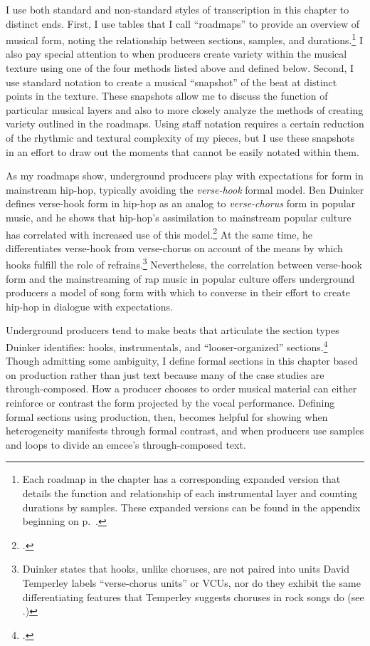 I use both standard and non-standard styles of transcription in this chapter to distinct
ends. First, I use tables that I call ``roadmaps'' to provide an overview of musical form,
noting the  relationship between sections, samples, and durations.\footnote{
    Each roadmap in the chapter has a corresponding expanded version that details the 
    function and relationship of each instrumental layer and counting durations by 
    samples. These expanded versions can be found in the appendix beginning on
    p.~\pageref{appendix:fullroadmaps}.} 
I also pay special attention to when producers create variety within the musical texture
using one of the four methods listed above and defined below. Second, I use standard
notation to create a musical ``snapshot'' of the beat at distinct points in the texture.
These snapshots allow me to discuss the function of particular musical layers and also to
more closely analyze the methods of creating variety outlined in the roadmaps. Using staff
notation requires a certain reduction of the rhythmic and textural complexity of my pieces,
but I use these snapshots in an effort to draw out the moments that cannot be easily notated
within them.

As my roadmaps show, underground producers play with expectations for form in mainstream
hip-hop, typically avoiding the \emph{verse-hook} formal model. Ben Duinker defines 
verse-hook form in hip-hop as an analog to \emph{verse-chorus} form in popular music, and
he shows that hip-hop's assimilation to mainstream popular culture has correlated with
increased use of this model.\footnote{
    \autocite[105]{benduinkerSongFormMainstreaming2020}.}\label{duinkerhookdef}
At the same time, he differentiates verse-hook from verse-chorus on account of the means
by which hooks fulfill the role of refrains.\footnote{
    Duinker states that hooks, unlike choruses, are not paired into units David Temperley
    labels ``verse-chorus units'' or VCUs, nor do they exhibit the same differentiating
    features that Temperley suggests choruses in rock songs do
    (see \autocite[159\textit{ff}]{davidtemperleyMusicalLanguageRock2018}.)}
Nevertheless, the correlation between verse-hook form and the mainstreaming of rap music
in popular culture offers underground producers a model of song form with which to converse
in their  effort to create hip-hop in dialogue with expectations.

Underground producers tend to make beats that articulate the section types Duinker identifies:
hooks, instrumentals, and ``looser-organized'' sections.\footnote{
    \autocite[95--101]{benduinkerSongFormMainstreaming2020}.} 
Though admitting some ambiguity, I define formal sections in this chapter based on production
rather than just text because many of the case studies are through-composed. How a producer 
chooses to order musical material can either reinforce or contrast the form projected by the
vocal performance. Defining formal sections using production, then, becomes helpful for
showing when heterogeneity manifests through formal contrast, and when producers use samples
and loops to divide an emcee's through-composed text.

